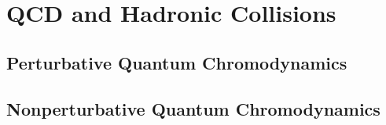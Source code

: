 \chapter{QCD and Hadronic Collisions}
\label{chap:QCD}

\section{Perturbative Quantum Chromodynamics}

\section{Nonperturbative Quantum Chromodynamics}